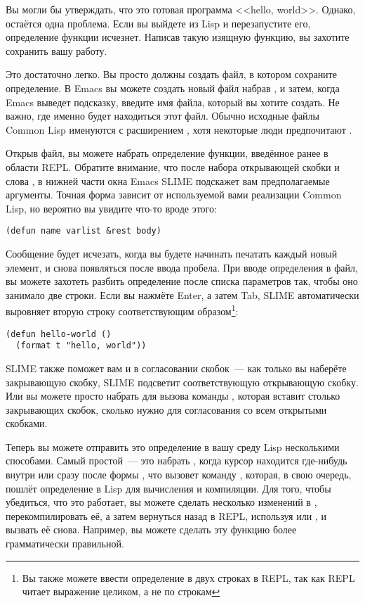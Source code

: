 Вы могли бы утверждать, что это готовая программа <<hello, world>>. Однако, остаётся одна
проблема. Если вы выйдете из Lisp и перезапустите его, определение функции
исчезнет. Написав такую изящную функцию, вы захотите сохранить вашу работу.

Это достаточно легко. Вы просто должны создать файл, в котором сохраните определение. В
Emacs вы можете создать новый файл набрав , и затем, когда Emacs выведет подсказку,
введите имя файла, который вы хотите создать. Не важно, где именно будет находиться этот
файл. Обычно исходные файлы Common Lisp именуются с расширением , хотя некоторые люди
предпочитают .

Открыв файл, вы можете набрать определение функции, введённое ранее в области
REPL. Обратите внимание, что после набора открывающей скобки и слова , в нижней части
окна Emacs SLIME подскажет вам предполагаемые аргументы. Точная форма зависит от
используемой вами реализации Common Lisp, но вероятно вы увидите что-то вроде этого:

\begin{lstlisting}
(defun name varlist &rest body)
\end{lstlisting}

Сообщение будет исчезать, когда вы будете начинать печатать каждый новый элемент, и снова
появляться после ввода пробела. При вводе определения в файл, вы можете захотеть разбить
определение после списка параметров так, чтобы оно занимало две строки. Если вы нажмёте
Enter, а затем Tab, SLIME автоматически выровняет вторую строку соответствующим
образом\footnote{Вы также можете ввести определение в двух строках в REPL, так как REPL
  читает выражение целиком, а не по строкам}:

\begin{lstlisting}
(defun hello-world ()
  (format t "hello, world"))
\end{lstlisting}

SLIME также поможет вам и в согласовании скобок~--- как только вы наберёте закрывающую
скобку, SLIME подсветит соответствующую открывающую скобку. Или вы можете просто набрать
 для вызова команды , которая вставит столько
закрывающих скобок, сколько нужно для согласования со всем открытыми скобками.

Теперь вы можете отправить это определение в вашу среду Lisp несколькими способами. Самый
простой~--- это набрать , когда курсор находится где-нибудь внутри или сразу после
формы , что вызовет команду , которая, в свою очередь, пошлёт
определение в Lisp для вычисления и компиляции. Для того, чтобы убедиться, что это
работает, вы можете сделать несколько изменений в , перекомпилировать её, а
затем вернуться назад в REPL, используя  или , и вызвать её снова. Например,
вы можете сделать эту функцию более грамматически правильной.

